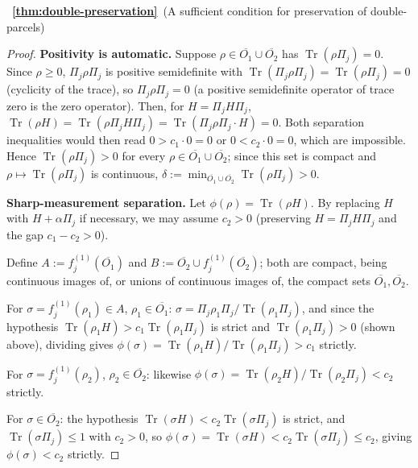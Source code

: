 \documentclass[11pt, onecolumn]{article}
\begin{document}
~{\bf \ref{thm:double-preservation}}~(A sufficient condition for preservation of double-parcels)

\begin{proof}
\textbf{Positivity is automatic.} Suppose $\rho\in\overline{O_1}\cup\overline{O_2}$ has $\operatorname{Tr}(\rho\Pi_j)=0$. Since $\rho\ge0$, $\Pi_j\rho\Pi_j$ is positive semidefinite with $\operatorname{Tr}(\Pi_j\rho\Pi_j)=\operatorname{Tr}(\rho\Pi_j)=0$ (cyclicity of the trace), so $\Pi_j\rho\Pi_j=0$ (a positive semidefinite operator of trace zero is the zero operator). Then, for $H=\Pi_jH\Pi_j$, $\operatorname{Tr}(\rho H)=\operatorname{Tr}(\rho\Pi_jH\Pi_j)=\operatorname{Tr}(\Pi_j\rho\Pi_j\cdot H)=0$. Both separation inequalities would then read $0>c_1\cdot0=0$ or $0<c_2\cdot0=0$, which are impossible. Hence $\operatorname{Tr}(\rho\Pi_j)>0$ for every $\rho\in\overline{O_1}\cup\overline{O_2}$; since this set is compact and $\rho\mapsto\operatorname{Tr}(\rho\Pi_j)$ is continuous, $\delta:=\min_{\overline{O_1}\cup\overline{O_2}}\operatorname{Tr}(\rho\Pi_j)>0$.

\medskip
\noindent\textbf{Sharp-measurement separation.}
Let $\phi(\rho)=\operatorname{Tr}(\rho H)$. By replacing $H$ with $H+\alpha\Pi_j$ if necessary, we may assume $c_2>0$ (preserving $H=\Pi_jH\Pi_j$ and the gap $c_1-c_2>0$).

Define $A:=f_j^{(1)}(\overline{O_1})$ and $B:=\overline{O_2}\cup f_j^{(1)}(\overline{O_2})$; both are compact, being continuous images of, or unions of continuous images of, the compact sets $\overline{O_1},\overline{O_2}$.

For $\sigma=f_j^{(1)}(\rho_1)\in A$, $\rho_1\in\overline{O_1}$: $\sigma=\Pi_j\rho_1\Pi_j/\operatorname{Tr}(\rho_1\Pi_j)$, and since the hypothesis $\operatorname{Tr}(\rho_1H)>c_1\operatorname{Tr}(\rho_1\Pi_j)$ is strict and $\operatorname{Tr}(\rho_1\Pi_j)>0$ (shown above), dividing gives $\phi(\sigma)=\operatorname{Tr}(\rho_1H)/\operatorname{Tr}(\rho_1\Pi_j)>c_1$ strictly.

For $\sigma=f_j^{(1)}(\rho_2)$, $\rho_2\in\overline{O_2}$: likewise $\phi(\sigma)=\operatorname{Tr}(\rho_2H)/\operatorname{Tr}(\rho_2\Pi_j)<c_2$ strictly.

For $\sigma\in\overline{O_2}$: the hypothesis $\operatorname{Tr}(\sigma H)<c_2\operatorname{Tr}(\sigma\Pi_j)$ is strict, and $\operatorname{Tr}(\sigma\Pi_j)\le1$ with $c_2>0$, so $\phi(\sigma)=\operatorname{Tr}(\sigma H)<c_2\operatorname{Tr}(\sigma\Pi_j)\le c_2$, giving $\phi(\sigma)<c_2$ strictly.


\end{proof}
\end{document}
